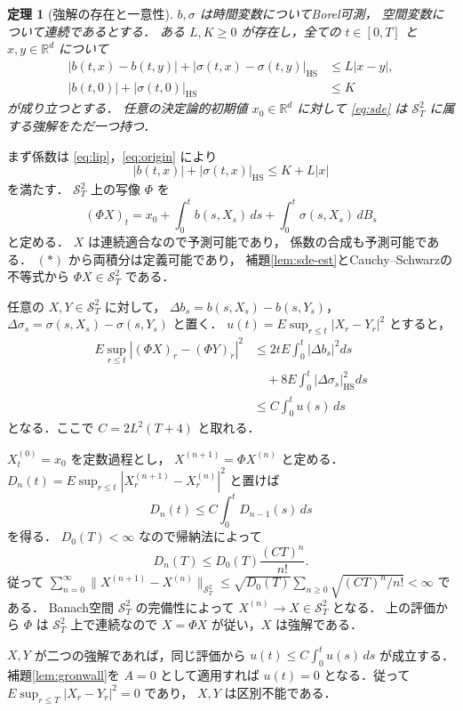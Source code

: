 \documentclass[a5paper,10pt,onecolumn]{jsarticle}
\makeatletter
\theoremstyle{mathnotetheorem}
\newtheorem{theorem}{定理}[section]
\renewcommand{\proofname}{証明}
\renewenvironment{proof}[1][\proofname]{%
  \par\pushQED{\qed}\normalfont\topsep4\p@\@plus2\p@\relax
  \trivlist\item[\hskip\labelsep\bfseries #1]\ignorespaces
}{\popQED\endtrivlist\@endpefalse}
\newcommand{\norm}[1]{\lVert #1\rVert}
\makeatother
\begin{document}
\begin{theorem}[強解の存在と一意性]\label{thm:exist-uniq}
$b,\sigma$ は時間変数についてBorel可測，
空間変数について連続であるとする．
ある $L,K\ge0$ が存在し，全ての $t\in[0,T]$ と
$x,y\in\mathbb R^d$ について
\begin{align}
 |b(t,x)-b(t,y)|
 +|\sigma(t,x)-\sigma(t,y)|_{\mathrm{HS}}
 &\le L|x-y|, \label{eq:lip}\\
 |b(t,0)|+|\sigma(t,0)|_{\mathrm{HS}}
 &\le K \label{eq:origin}
\end{align}
が成り立つとする．
任意の決定論的初期値 $x_0\in\mathbb R^d$ に対して
\eqref{eq:sde} は
$\mathcal S^2_T$ に属する強解をただ一つ持つ．
\end{theorem}
\begin{proof}
まず係数は \eqref{eq:lip}，\eqref{eq:origin} により
\[
 |b(t,x)|+|\sigma(t,x)|_{\mathrm{HS}}
 \le K+L|x|
 \tag{$*$}
\]
を満たす．
$\mathcal S^2_T$ 上の写像 $\Phi$ を
\[
 (\Phi X)_t=x_0+
 \int_0^tb(s,X_s)\,ds+
 \int_0^t\sigma(s,X_s)\,dB_s
\]
と定める．
$X$ は連続適合なので予測可能であり，
係数の合成も予測可能である．
$(*)$ から両積分は定義可能であり，
補題\ref{lem:sde-est}とCauchy--Schwarzの不等式から
$\Phi X\in\mathcal S^2_T$ である．

任意の $X,Y\in\mathcal S^2_T$ に対して，
$\Delta b_s=b(s,X_s)-b(s,Y_s)$，
$\Delta\sigma_s=\sigma(s,X_s)-\sigma(s,Y_s)$ と置く．
$u(t)=E\sup_{r\le t}|X_r-Y_r|^2$ とすると，
\begin{align*}
 E\sup_{r\le t}|(\Phi X)_r-(\Phi Y)_r|^2
 &\le2tE\int_0^t|\Delta b_s|^2ds\\
 &\quad+8E\int_0^t|\Delta\sigma_s|_{\mathrm{HS}}^2ds\\
 &\le C\int_0^tu(s)\,ds
\end{align*}
となる．ここで $C=2L^2(T+4)$ と取れる．

$X^{(0)}_t=x_0$ を定数過程とし，
$X^{(n+1)}=\Phi X^{(n)}$ と定める．
$D_n(t)=E\sup_{r\le t}|X_r^{(n+1)}-X_r^{(n)}|^2$
と置けば
\[
 D_n(t)\le C\int_0^tD_{n-1}(s)\,ds
\]
を得る．
$D_0(T)<\infty$ なので帰納法によって
\[
 D_n(T)\le D_0(T)\frac{(CT)^n}{n!}.
\]
従って
$\sum_{n=0}^\infty\norm{X^{(n+1)}-X^{(n)}}_{\mathcal S^2_T}
 \le\sqrt{D_0(T)}\sum_{n\ge0}\sqrt{(CT)^n/n!}<\infty$ である．
Banach空間 $\mathcal S^2_T$ の完備性によって
$X^{(n)}\to X\in\mathcal S^2_T$ となる．
上の評価から $\Phi$ は $\mathcal S^2_T$ 上で連続なので
$X=\Phi X$ が従い，$X$ は強解である．

$X,Y$ が二つの強解であれば，同じ評価から
$u(t)\le C\int_0^tu(s)\,ds$ が成立する．
補題\ref{lem:gronwall}を $A=0$ として適用すれば
$u(t)=0$ となる．従って
$E\sup_{r\le T}|X_r-Y_r|^2=0$ であり，
$X,Y$ は区別不能である．
\end{proof}
\end{document}
